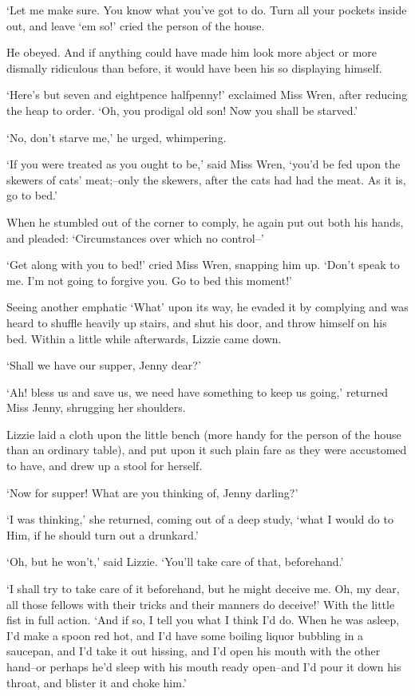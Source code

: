‘Let me make sure. You know what you’ve got to do. Turn all your pockets
inside out, and leave ‘em so!’ cried the person of the house.

He obeyed. And if anything could have made him look more abject or more
dismally ridiculous than before, it would have been his so displaying
himself.

‘Here’s but seven and eightpence halfpenny!’ exclaimed Miss Wren, after
reducing the heap to order. ‘Oh, you prodigal old son! Now you shall be
starved.’

‘No, don’t starve me,’ he urged, whimpering.

‘If you were treated as you ought to be,’ said Miss Wren, ‘you’d be fed
upon the skewers of cats’ meat;--only the skewers, after the cats had
had the meat. As it is, go to bed.’

When he stumbled out of the corner to comply, he again put out both his
hands, and pleaded: ‘Circumstances over which no control--’

‘Get along with you to bed!’ cried Miss Wren, snapping him up. ‘Don’t
speak to me. I’m not going to forgive you. Go to bed this moment!’

Seeing another emphatic ‘What’ upon its way, he evaded it by complying
and was heard to shuffle heavily up stairs, and shut his door, and throw
himself on his bed. Within a little while afterwards, Lizzie came down.

‘Shall we have our supper, Jenny dear?’

‘Ah! bless us and save us, we need have something to keep us going,’
returned Miss Jenny, shrugging her shoulders.

Lizzie laid a cloth upon the little bench (more handy for the person of
the house than an ordinary table), and put upon it such plain fare as
they were accustomed to have, and drew up a stool for herself.

‘Now for supper! What are you thinking of, Jenny darling?’

‘I was thinking,’ she returned, coming out of a deep study, ‘what I
would do to Him, if he should turn out a drunkard.’

‘Oh, but he won’t,’ said Lizzie. ‘You’ll take care of that, beforehand.’

‘I shall try to take care of it beforehand, but he might deceive me.
Oh, my dear, all those fellows with their tricks and their manners do
deceive!’ With the little fist in full action. ‘And if so, I tell you
what I think I’d do. When he was asleep, I’d make a spoon red hot, and
I’d have some boiling liquor bubbling in a saucepan, and I’d take it
out hissing, and I’d open his mouth with the other hand--or perhaps he’d
sleep with his mouth ready open--and I’d pour it down his throat, and
blister it and choke him.’

